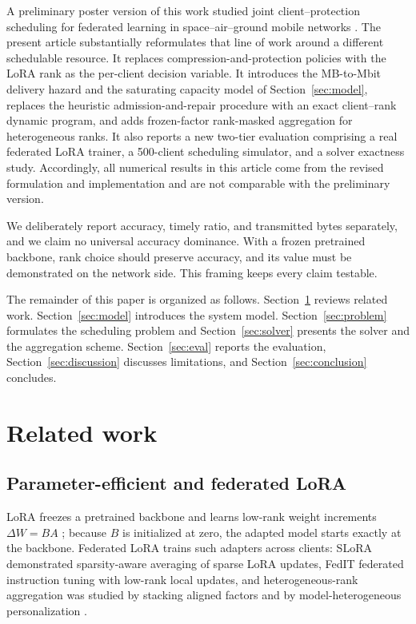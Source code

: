 \documentclass[preprint,12pt]{elsarticle}
\begin{document}
A preliminary poster version of this work studied joint client--protection scheduling for federated learning in space--air--ground mobile networks \cite{ma2026mswim}. The present article substantially reformulates that line of work around a different schedulable resource. It replaces compression-and-protection policies with the LoRA rank as the per-client decision variable. It introduces the MB-to-Mbit delivery hazard and the saturating capacity model of Section~\ref{sec:model}, replaces the heuristic admission-and-repair procedure with an exact client--rank dynamic program, and adds frozen-factor rank-masked aggregation for heterogeneous ranks. It also reports a new two-tier evaluation comprising a real federated LoRA trainer, a 500-client scheduling simulator, and a solver exactness study. Accordingly, all numerical results in this article come from the revised formulation and implementation and are not comparable with the preliminary version.

We deliberately report accuracy, timely ratio, and transmitted bytes separately, and we claim no universal accuracy dominance. With a frozen pretrained backbone, rank choice should preserve accuracy, and its value must be demonstrated on the network side. This framing keeps every claim testable.

The remainder of this paper is organized as follows. Section~\ref{sec:related} reviews related work. Section~\ref{sec:model} introduces the system model. Section~\ref{sec:problem} formulates the scheduling problem and Section~\ref{sec:solver} presents the solver and the aggregation scheme. Section~\ref{sec:eval} reports the evaluation, Section~\ref{sec:discussion} discusses limitations, and Section~\ref{sec:conclusion} concludes.

\section{Related work}
\label{sec:related}

\subsection{Parameter-efficient and federated LoRA}
LoRA freezes a pretrained backbone and learns low-rank weight increments $\Delta W = BA$ \cite{hu2022lora}; because $B$ is initialized at zero, the adapted model starts exactly at the backbone. Federated LoRA trains such adapters across clients: SLoRA \cite{babakniya2023slora} demonstrated sparsity-aware averaging of sparse LoRA updates, FedIT \cite{zhang2024fedit} federated instruction tuning with low-rank local updates, and heterogeneous-rank aggregation was studied by stacking aligned factors \cite{wang2024flora} and by model-heterogeneous personalization \cite{yi2024fedlora}.
\end{document}
